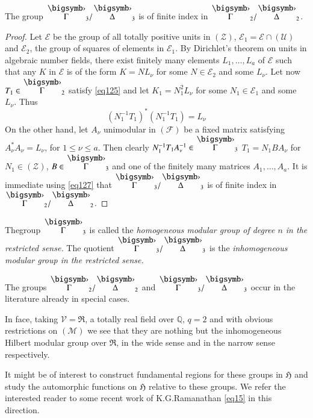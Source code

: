 \begin{proposition}\label{chap1:prop19}
The group $\overdot{\Gamma}_{3}/\overdot{\Delta}_{3}$ is of finite
index in $\overdot{\Gamma}_{2}/\overdot{\Delta}_{2}$.
\end{proposition}


\begin{proof}
Let $\mathscr{E}$ be the group of all totally positive units in
$(\mathscr{Z})$, $\mathscr{E}_{1}=\mathscr{E}\cap (\mathscr{U})$ and
$\mathscr{E}_{2}$, the group of squares of elements in
$\mathscr{E}_{1}$. By Dirichlet's theorem on units in algebraic number
fields, there exist finitely many elements $L_{1},\ldots,L_{a}$ of
$\mathscr{E}$ such that any $K$ in $\mathscr{E}$ is of the form
$K = NL_{\nu}$ for some $N\in\mathscr{E}_{2}$ and some $L_{\nu}$. Let
now $T_{1}\in\overdot{\Gamma}_{2}$ satisfy \eqref{eq125} and let
$K_{1}=N^{2}_{1}L_{\nu}$ for some $N_{1}\in\mathscr{E}_{1}$ and some
$L_{\nu}$. Thus
\begin{equation*}
(N^{-1}_{1}T_{1})^{\ast}(N^{-1}_{1}T_{1})
=L_{\nu}\tag{127}\label{eq127}
\end{equation*}
On the other hand, let $A_{\nu}$ unimodular in $(\mathscr{F})$ be a
fixed matrix satisfying $A^{\ast}_{\nu}A_{\nu}=L_{\nu}$, for $1\leq
\nu\leq a$. Then clearly
$N^{-1}_{1}T_{1}A^{-1}_{\nu}\in\overdot{\Gamma}_{3}$ \ie
$T_{1}=N_{1}BA_{\nu}$ for $N_{1}\in(\mathscr{Z})$,
$B\in\overdot{\Gamma}_{3}$ and one of the finitely many matrices
$A_{1},\ldots,A_{a}$. It is immediate using \eqref{eq127} that
$\overdot{\Gamma}_{3}/\overdot{\Delta}_{3}$ is of finite index in
$\overdot{\Gamma}_{2}/\overdot{\Delta}_{2}$. 
\end{proof}

The\pageoriginale group $\overdot{\Gamma}_{3}$ is called the {\em
  homogeneous modular group of degree $n$ in the restricted sense.}
The quotient $\overdot{\Gamma}_{3}/\overdot{\Delta}_{3}$ is the {\em
  inhomogeneous modular group in the restricted sense.}

The groups $\overdot{\Gamma}_{2}/\overdot{\Delta}_{2}$ and
$\overdot{\Gamma}_{3}/\overdot{\Delta}_{3}$ occur in the literature
already in special cases.

In face, taking $\mathscr{V}=\mathfrak{R}$, a totally real field over
$\mathbb{Q}$, $q=2$ and with obvious restrictions on $(\mathscr{M})$
we see that they are nothing but the inhomogeneous Hilbert modular
group over $\mathfrak{R}$, in the wide sense and in the narrow sense
respectively.

It might be of interest to construct fundamental regions for these
groups in $\mathfrak{H}$ and study the automorphic functions on
$\mathfrak{H}$ relative to these groups. We refer the interested
reader to some recent work of K.G.\@ Ramanathan \eqref{eq15} in this
direction. 

